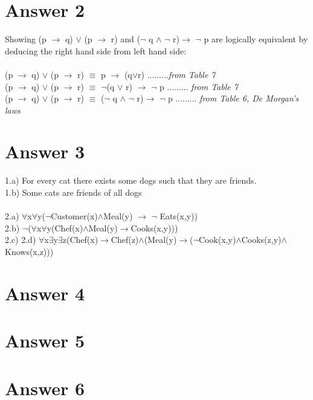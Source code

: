 \documentclass[12pt]{article}
\begin{document}
\section*{Answer 2}
Showing (p $\rightarrow$ q) $\vee$ (p $\rightarrow$ r) and ($\neg$ q $\wedge$ $\neg$ r)$\rightarrow$ $\neg$ p are logically equivalent by deducing the right hand side from left hand side: \\
\\
(p $\rightarrow$ q) $\vee$ (p $\rightarrow$ r) $\equiv$ p $\rightarrow$ (q$\vee$r) .........\textit{from Table 7}
\\
(p $\rightarrow$ q) $\vee$ (p $\rightarrow$ r) $\equiv$ $\neg$(q $\vee$ r) $\rightarrow$ $\neg$ p ......... \textit{from Table 7}
\\
(p $\rightarrow$ q) $\vee$ (p $\rightarrow$ r) $\equiv$ ($\neg$ q $\wedge$ $\neg$ r)$\rightarrow$ $\neg$ p ......... \textit{from Table 6, De Morgan’s laws}






\section*{Answer 3}
1.a) For every cat there exists some dogs such that they are friends. \\
1.b) Some cats are friends of all dogs\\ \\

2.a) $\forall$x$\forall$y($\neg$Customer(x)$\wedge$Meal(y) $\rightarrow$ $\neg$ Eats(x,y)) \\
2.b) $\neg$($\forall$x$\forall$y(Chef(x)$\wedge$Meal(y)$\rightarrow$Cooks(x,y)))\\
2.c)
2.d) $\forall$x$\exists$y$\exists$z(Chef(x)$\rightarrow$Chef(z)$\wedge$(Meal(y)$\rightarrow$($\neg$Cook(x,y)$\wedge$Cooks(z,y)$\wedge$Knows(x,z)))

\section*{Answer 4}


\section*{Answer 5}


\section*{Answer 6}
\end{document}
